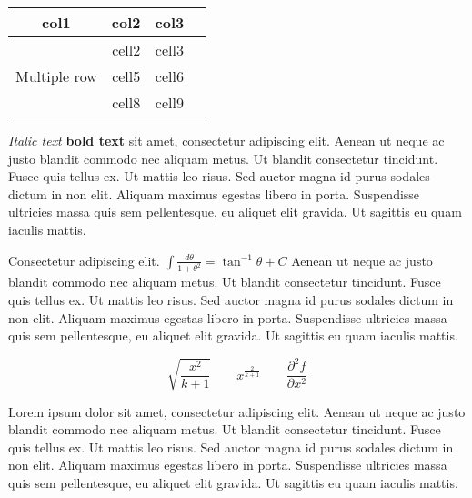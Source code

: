 \documentclass{csmagazine}
\begin{document}

\begin{table}[h!]
	\begin{center}
		\begin{tabular}{ |c|c|c|c| } 
			\hline
			col1 & col2 & col3 \\
			\hline
			\multirow{3}{4em}{Multiple row} & cell2 & cell3 \\ 
			& cell5 & cell6 \\ 
			& cell8 & cell9 \\ 
			\hline
		\end{tabular}
	\end{center}
\end{table}

\textit{Italic text} \textbf{bold text} sit amet, consectetur adipiscing elit. Aenean ut neque ac justo blandit commodo nec aliquam metus. Ut blandit consectetur tincidunt. Fusce quis tellus ex. Ut mattis leo risus. Sed auctor magna id purus sodales dictum in non elit. Aliquam maximus egestas libero in porta. Suspendisse ultricies massa quis sem pellentesque, eu aliquet elit gravida. Ut sagittis eu quam iaculis mattis.

Consectetur adipiscing elit. $\int\frac{d\theta} {1+\theta^2}=\tan^{-1} \theta+C$ Aenean ut neque ac justo blandit commodo nec aliquam metus. Ut blandit consectetur tincidunt. Fusce quis tellus ex. Ut mattis leo risus. Sed auctor magna id purus sodales dictum in non elit. Aliquam maximus egestas libero in porta. Suspendisse ultricies massa quis sem pellentesque, eu aliquet elit gravida. Ut sagittis eu quam iaculis mattis.


\begin{equation}
\sqrt{\frac{x^2}{k+1}}\qquad
x^\frac{2}{k+1}\qquad
\frac{\partial^2f}{\partial x^2}
\end{equation}

Lorem ipsum dolor sit amet, consectetur adipiscing elit. Aenean ut neque ac justo blandit commodo nec aliquam metus. Ut blandit consectetur tincidunt. Fusce quis tellus ex. Ut mattis leo risus. Sed auctor magna id purus sodales dictum in non elit. Aliquam maximus egestas libero in porta. Suspendisse ultricies massa quis sem pellentesque, eu aliquet elit gravida. Ut sagittis eu quam iaculis mattis.
\end{document}
